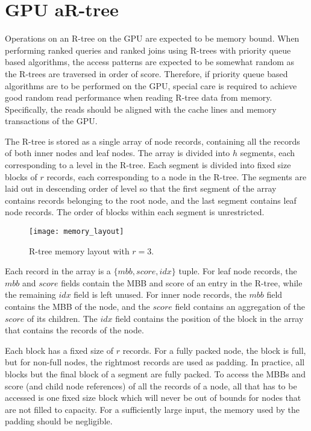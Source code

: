 \section{GPU aR-tree}

Operations on an R-tree on the GPU are expected to be memory bound. When performing ranked queries and ranked joins using R-trees with priority queue based algorithms, the access patterns are expected to be somewhat random as the R-trees are traversed in order of score. Therefore, if priority queue based algorithms are to be performed on the GPU, special care is required to achieve good random read performance when reading R-tree data from memory. Specifically, the reads should be aligned with the cache lines and memory transactions of the GPU.

The R-tree is stored as a single array of node records, containing all the records of both inner nodes and leaf nodes. The array is divided into \(h\) segments, each corresponding to a level in the R-tree. Each segment is divided into fixed size blocks of \(r\) records, each corresponding to a node in the R-tree. The segments are laid out in descending order of level so that the first segment of the array contains records belonging to the root node, and the last segment contains leaf node records. The order of blocks within each segment is unrestricted.

\begin{figure}[h]
    \centering
    \texttt{[image: memory\_layout]}
    \caption{R-tree memory layout with \(r = 3\).}
    \label{fig:memory-layout}
\end{figure}

Each record in the array is a \(\{mbb, score, idx\}\) tuple. For leaf node records, the \(mbb\) and \(score\) fields contain the MBB and score of an entry in the R-tree, while the remaining \(idx\) field is left unused. For inner node records, the \(mbb\) field contains the MBB of the node, and the \(score\) field contains an aggregation of the \(score\) of its children. The \(idx\) field contains the position of the block in the array that contains the records of the node.

Each block has a fixed size of \(r\) records. For a fully packed node, the block is full, but for non-full nodes, the rightmost records are used as padding. In practice, all blocks but the final block of a segment are fully packed. To access the MBBs and score (and child node references) of all the records of a node, all that has to be accessed is one fixed size block which will never be out of bounds for nodes that are not filled to capacity. For a sufficiently large input, the memory used by the padding should be negligible.

